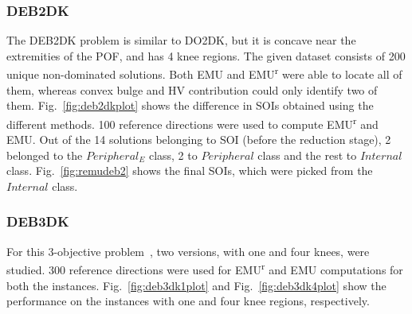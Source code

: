 \subsubsection{DEB2DK}
The DEB2DK problem \cite{branke2004finding} is similar to DO2DK, but it is concave near the extremities of the POF, and has 4 knee regions. The given dataset consists of 200 unique non-dominated solutions. Both EMU and EMU\textsuperscript{r} were able to locate all of them, whereas convex bulge and HV contribution could only identify two of them. Fig.~\ref{fig:deb2dkplot} shows the difference in SOIs obtained using the different methods. 100 reference directions were used to compute EMU\textsuperscript{r} and EMU. Out of the 14 solutions belonging to SOI (before the reduction stage), 2 belonged to the $Peripheral_E$ class, 2 to $Peripheral$ class and the rest to $Internal$ class. Fig.~\ref{fig:remudeb2} shows the final SOIs, which were picked from the $Internal$ class. 

\begin{figure*}[!htb]
	\centering    
	\quad
	\quad
	\quad
	\quad     
	\caption{DEB2DK with 4 knee regions: (a) EMU\textsuperscript{r}, (b) EMU, (c) Convex Bulge, (d) HV contribution}
	\label{fig:deb2dkplot}
\end{figure*}

\subsubsection{DEB3DK}

For this 3-objective problem~\cite{branke2004finding}, two versions, with one and four knees, were studied. 300 reference directions were used for EMU\textsuperscript{r} and EMU computations for both the instances. Fig.~\ref{fig:deb3dk1plot} and Fig.~\ref{fig:deb3dk4plot} show the performance on the instances with one and four knee regions, respectively. 

\begin{figure*}[!htb]
	\centering    
	\quad
	\quad
	\quad
	\quad 
	\caption{DEB3DK with 1 knee region: (a) EMU\textsuperscript{r}, (b) EMU, (c) Convex Bulge, (d) HV contribution}
	\label{fig:deb3dk1plot}
\end{figure*}

